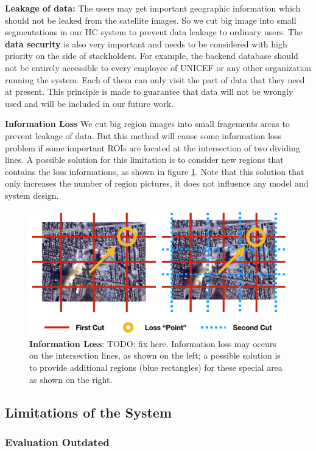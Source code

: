 \textbf{Leakage of data:} 
The users may get important geographic information which should not be leaked from the satellite images. So we cut big image into small segmentations in our HC system to prevent data leakage to ordinary users. 
The \textbf{data security} is also very important and needs to be considered with high priority on the side of stackholders. For example, 
the backend database should not be entirely accessible to every employee of UNICEF or any other organization running the system.
Each of them can only visit the part of data that they need at present. This principle is made to guarantee 
that data will not be wrongly used and will be included in our future work.

\textbf{Information Loss}
We cut big region images into small fragements areas to prevent leakage of data. 
But this method will cause some information loss problem if some important ROIs are 
located at the intersection of two dividing lines.
A possible solution for this limitation is to consider new regions that contains the loss
informations, as shown in figure \ref{fig:information_loss}. Note that this solution that
only increases the number of region pictures, it does not influence any model and system design.

\begin{figure}[H]
\centering
\includegraphics[width=0.7\columnwidth]{figures/information_loss3}
\caption{\textbf{Information Loss}: TODO: fix here. Information loss may occurs on the intersection lines, as shown on the left; a possible solution
is to provide additional regions (blue rectangles) for these special area as shown on the right.}
\label{fig:information_loss}
\end{figure}

\subsection{Limitations of the System}

\subsubsection{Evaluation Outdated}

